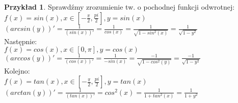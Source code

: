 \documentclass{article}
\theoremstyle{definition}
\theoremstyle{definition}
\theoremstyle{definition}
\newtheorem{pk}{Przykład}[subsection]
\theoremstyle{definition}
\begin{document}
\begin{pk}
    Sprawdźmy zrozumienie tw. o pochodnej funkcji odwrotnej:\\
    $f(x)=sin(x), x\in[-\frac{\pi}{2},\frac{pi}{2}], y=sin(x)$\\
    $\left(arcsin(y)\right)'=\frac{1}{(sin(x))'} = \frac{1}{cos(x)}=\frac{1}{\sqrt{1-sin^2(x)}}=\frac{1}{\sqrt{1-y^2}}$\\
    Następnie:\\
    $f(x)=cos(x), x\in[0,\pi], y=cos(x)$\\
    $\left(arccos(y)\right)'=\frac{1}{(cos(x))'} = \frac{1}{-sin(x)} = \frac{-1}{\sqrt{1-cos^2(y)}}=\frac{-1}{\sqrt{1-y^2}}$\\
    Kolejno:\\
    $f(x)=tan(x), x\in[-\frac{\pi}{2},\frac{pi}{2}], y=tan(x)$\\
    $\left(arctan(y)\right)'=\frac{1}{(tan(x))'}=cos^2(x)=\frac{1}{1+tan^2(x)}=\frac{1}{1+y^2}$
\end{pk}
\end{document}
